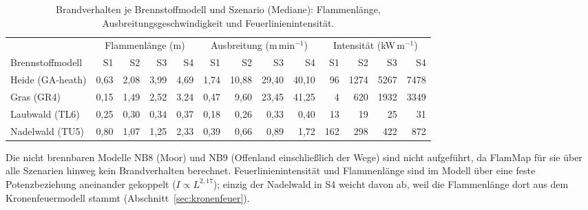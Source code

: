 \begin{table}[htbp]
  \centering
  \caption{Brandverhalten je Brennstoffmodell und Szenario (Mediane): Flammenlänge, Ausbreitungsgeschwindigkeit und Feuerlinienintensität.}
  \label{tab:brandverhalten}
  \small
  \setlength{\tabcolsep}{3.5pt}
  \begin{tabular}{@{}lrrrrrrrrrrrr@{}}
    \toprule
    & \multicolumn{4}{c}{Flammenlänge (m)} & \multicolumn{4}{c}{Ausbreitung (m\,min$^{-1}$)} & \multicolumn{4}{c}{Intensität (kW\,m$^{-1}$)} \\
    \cmidrule(lr){2-5}\cmidrule(lr){6-9}\cmidrule(lr){10-13}
    Brennstoffmodell & S1 & S2 & S3 & S4 & S1 & S2 & S3 & S4 & S1 & S2 & S3 & S4 \\
    \midrule
    Heide (GA-heath) & 0{,}63 & 2{,}08 & 3{,}99 & 4{,}69 & 1{,}74 & 10{,}88 & 29{,}40 & 40{,}10 & 96 & 1274 & 5267 & 7478 \\
    Gras (GR4) & 0{,}15 & 1{,}49 & 2{,}52 & 3{,}24 & 0{,}47 & 9{,}60 & 23{,}45 & 41{,}25 & 4 & 620 & 1932 & 3349 \\
    Laubwald (TL6) & 0{,}25 & 0{,}30 & 0{,}34 & 0{,}37 & 0{,}18 & 0{,}26 & 0{,}33 & 0{,}40 & 13 & 19 & 25 & 31 \\
    Nadelwald (TU5) & 0{,}80 & 1{,}07 & 1{,}25 & 2{,}33 & 0{,}39 & 0{,}66 & 0{,}89 & 1{,}72 & 162 & 298 & 422 & 872 \\
    \bottomrule
  \end{tabular}
  \par\smallskip\footnotesize Die nicht brennbaren Modelle NB8 (Moor) und NB9 (Offenland einschließlich der Wege) sind nicht aufgeführt, da FlamMap für sie über alle Szenarien hinweg kein Brandverhalten berechnet. Feuerlinienintensität und Flammenlänge sind im Modell über eine feste Potenzbeziehung aneinander gekoppelt ($I \propto L^{2{,}17}$); einzig der Nadelwald in S4 weicht davon ab, weil die Flammenlänge dort aus dem Kronenfeuermodell stammt (Abschnitt~\ref{sec:kronenfeuer}).
\end{table}
